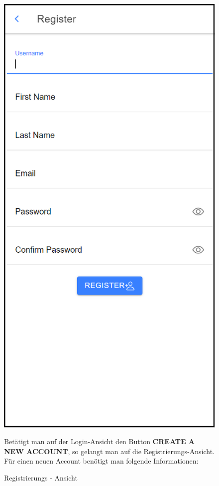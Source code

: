 \begin{figure}[H]
    \centering
    \begin{minipage}{.4\textwidth}
        \begin{center}
            \includegraphics[width=0.8\linewidth]{images/Register.png}
        \end{center}
        \caption{Registrierungs - Ansicht}
        \label{fig:register}
    \end{minipage}%
    \begin{minipage}{.6\textwidth}
        \begin{changemargin}{0.5cm}{0cm}            
            Betätigt man auf der Login-Ansicht den Button \glqq \textbf{CREATE A NEW ACCOUNT}\grqq{}, so gelangt man auf die Registrierungs-Ansicht. Für einen neuen Account benötigt man folgende Informationen:


\end{changemargin}
\end{minipage}
\end{figure}
